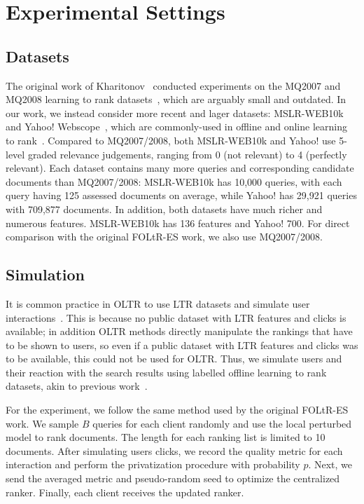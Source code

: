 \section{Experimental Settings}

\subsection{Datasets}
The original work of Kharitonov~\cite{kharitonov2019federated} conducted experiments on the MQ2007 and MQ2008 learning to rank datasets~\cite{DBLP:journals/corr/QinL13}, which are arguably small and outdated. In our work, we instead consider more recent and lager datasets: MSLR-WEB10k~\cite{DBLP:journals/corr/QinL13} and Yahoo! Webscope~\cite{DBLP:journals/jmlr/ChapelleC11}, which are commonly-used in offline and online learning to rank~\cite{zhuang2020counterfactual,hofmann2013reusing,jagerman2019model,oosterhuis2018differentiable}. Compared to MQ2007/2008, both MSLR-WEB10k and Yahoo! use 5-level graded relevance judgements, ranging from 0 (not relevant) to 4 (perfectly relevant).
Each dataset contains many more queries and corresponding candidate documents than MQ2007/2008: MSLR-WEB10k has 10,000 queries, with each query having 125 assessed documents on average, while Yahoo! has 29,921 queries with 709,877 documents. In addition, both datasets have much richer and numerous features. MSLR-WEB10k has 136 features and Yahoo! 700. For direct comparison with the original FOLtR-ES work, we also use MQ2007/2008.

\subsection{Simulation}
It is common practice in OLTR to use LTR datasets and simulate user interactions~\cite{DBLP:conf/wsdm/SchuthOWR16, hofmann2013reusing}. This is because no public dataset with LTR features and clicks is available; in addition OLTR methods directly manipulate the rankings that have to be shown to users, so even if a public dataset with LTR features and clicks was to be available, this could not be used for OLTR. Thus, we simulate users and their reaction with the search results using labelled offline learning to rank datasets, akin to previous work~\cite{DBLP:conf/wsdm/SchuthOWR16, hofmann2013reusing}.

For the experiment, we follow the same method used by the original FOLtR-ES work. We sample $B$ queries for each client randomly and use the local perturbed model to rank documents. The length for each ranking list is limited to 10 documents. After simulating users clicks, we record the quality metric for each interaction and perform the privatization procedure with probability $p$. Next, we send the averaged metric and pseudo-random seed to optimize the centralized ranker. Finally, each client receives the updated ranker. 

